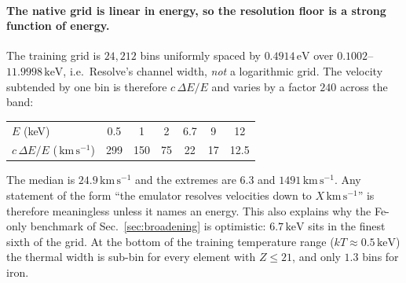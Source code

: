 \documentclass[11pt,a4paper]{article}
\newcommand{\kms}{\,\mathrm{km\,s^{-1}}}
\begin{document}
\paragraph{The native grid is linear in energy, so the resolution floor
is a strong function of energy.} The training grid is $24{,}212$ bins
uniformly spaced by $0.4914\,\mathrm{eV}$ over $0.1002$--$11.9998\,
\mathrm{keV}$, i.e.\ Resolve's channel width, \emph{not} a logarithmic
grid. The velocity subtended by one bin is therefore $c\,\Delta E/E$ and
varies by a factor $240$ across the band:

\begin{center}
\begin{tabular}{lcccccc}
\toprule
$E$ (keV) & 0.5 & 1 & 2 & 6.7 & 9 & 12\\
$c\,\Delta E/E$ ($\kms$) & 299 & 150 & 75 & 22 & 17 & 12.5\\
\bottomrule
\end{tabular}
\end{center}

\noindent The median is $24.9\kms$ and the extremes are $6.3$ and
$1491\kms$. Any statement of the form ``the emulator resolves velocities
down to $X\kms$'' is therefore meaningless unless it names an energy.
This also explains why the Fe-only benchmark of
Sec.~\ref{sec:broadening} is optimistic: $6.7\,\mathrm{keV}$ sits in the
finest sixth of the grid. At the bottom of the training temperature
range ($kT \approx 0.5\,\mathrm{keV}$) the thermal width is sub-bin for
every element with $Z \le 21$, and only $1.3$ bins for iron.
\end{document}
